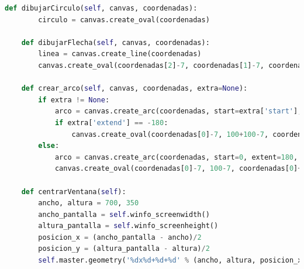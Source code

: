 \begin{lstlisting}[language=Python]
	def dibujarCirculo(self, canvas, coordenadas):
		circulo = canvas.create_oval(coordenadas)
	
	def dibujarFlecha(self, canvas, coordenadas):
		linea = canvas.create_line(coordenadas)
		canvas.create_oval(coordenadas[2]-7, coordenadas[1]-7, coordenadas[2]+7,coordenadas[1]+7, fill = 'black')
	
	def crear_arco(self, canvas, coordenadas, extra=None):
		if extra != None:
			arco = canvas.create_arc(coordenadas, start=extra['start'], extent=extra['extend'], style='arc')
			if extra['extend'] == -180:
				canvas.create_oval(coordenadas[0]-7, 100+100-7, coordenadas[0]+7, 100+100+7, fill = 'black')
		else:
			arco = canvas.create_arc(coordenadas, start=0, extent=180, style='arc')
			canvas.create_oval(coordenadas[0]-7, 100-7, coordenadas[0]+7, 100+7, fill = 'black')
	
	def centrarVentana(self):
		ancho, altura = 700, 350
		ancho_pantalla = self.winfo_screenwidth()
		altura_pantalla = self.winfo_screenheight()
		posicion_x = (ancho_pantalla - ancho)/2
		posicion_y = (altura_pantalla - altura)/2
		self.master.geometry('%dx%d+%d+%d' % (ancho, altura, posicion_x, posicion_y))
	
	\end{lstlisting}
